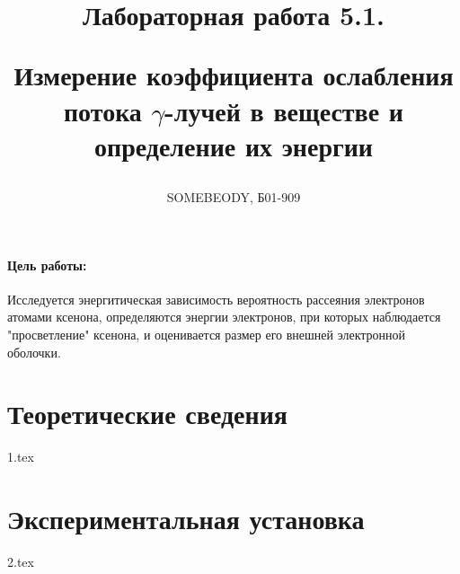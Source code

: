 \documentclass[a5paper, 10pt, twoside]{article} %
\title
{\hfill \break  \hfill \break
\hfill \break  \hfill \break
Лабораторная работа 5.1.

Измерение коэффициента ослабления потока $\gamma$-лучей в веществе и определение
их энергии}
\author{SOMEBEODY, Б01-909}
\begin{document}
\maketitle



\thispagestyle{empty} %

\newpage

\tableofcontents %
\thispagestyle{plain}
\newpage


\paragraph{Цель работы:}

Исследуется энергитическая зависимость вероятность рассеяния электронов атомами
ксенона, определяются энергии электронов, при которых наблюдается "просветление"
ксенона, и оценивается размер его внешней электронной оболочки.

\section{Теоретические сведения}
{1.tex}

\section{Экспериментальная установка}
{2.tex}
\end{document}
